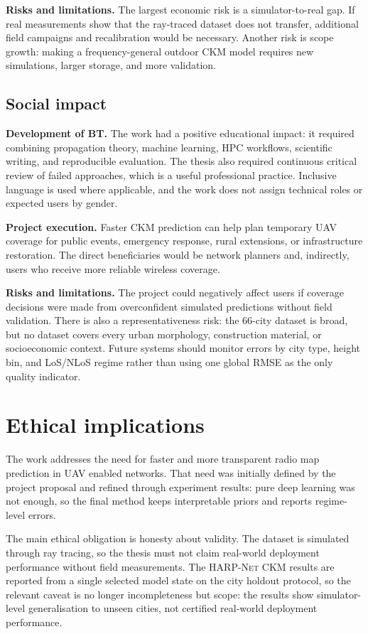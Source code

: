 \textbf{Risks and limitations.} The largest economic risk is a simulator-to-real
gap. If real measurements show that the ray-traced dataset does not transfer,
additional field campaigns and recalibration would be necessary. Another risk
is scope growth: making a frequency-general outdoor CKM model requires new
simulations, larger storage, and more validation.

\subsection{Social impact}

\textbf{Development of BT.} The work had a positive educational impact: it
required combining propagation theory, machine learning, HPC workflows,
scientific writing, and reproducible evaluation. The thesis also required
continuous critical review of failed approaches, which is a useful professional
practice. Inclusive language is used where applicable, and the work does not
assign technical roles or expected users by gender.

\textbf{Project execution.} Faster CKM prediction can help plan temporary UAV
coverage for public events, emergency response, rural extensions, or
infrastructure restoration. The direct beneficiaries would be network planners
and, indirectly, users who receive more reliable wireless coverage.

\textbf{Risks and limitations.} The project could negatively affect users if
coverage decisions were made from overconfident simulated predictions without
field validation. There is also a representativeness risk: the 66-city dataset
is broad, but no dataset covers every urban morphology, construction material,
or socioeconomic context. Future systems should monitor errors by city type,
height bin, and LoS/NLoS regime rather than using one global RMSE as the only
quality indicator.

\section{Ethical implications}

The work addresses the need for faster and more transparent radio map
prediction in UAV enabled networks. That need was initially defined by the
project proposal and refined through experiment results: pure deep learning was
not enough, so the final method keeps interpretable priors and reports
regime-level errors.

The main ethical obligation is honesty about validity. The dataset is simulated
through ray tracing, so the thesis must not claim real-world deployment
performance without field measurements. The \textsc{HARP-Net CKM} results are reported
from a single selected model state on the city holdout protocol, so the relevant
caveat is no longer incompleteness but scope: the results show simulator-level
generalisation to unseen cities, not certified real-world deployment
performance.

